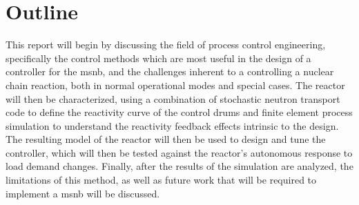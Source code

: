 \section{Outline}
This report will begin by discussing the field of process control engineering, specifically the control methods which are most useful in the design of a controller for the \acs{msnb}, and the challenges inherent to a controlling a nuclear chain reaction, both in normal operational modes and special cases. The reactor will then be characterized, using a combination of stochastic neutron transport code to define the reactivity curve of the control drums and finite element process simulation to understand the reactivity feedback effects intrinsic to the design. The resulting model of the reactor will then be used to design and tune the controller, which will then be tested against the reactor's autonomous response to load demand changes. Finally, after the results of the simulation are analyzed, the limitations of this method, as well as future work that will be required to implement a \acl{msnb} will be discussed.   